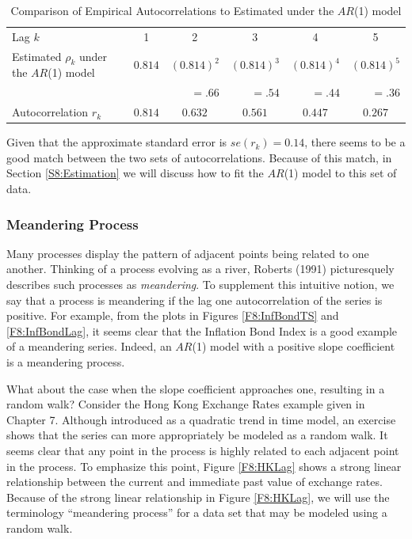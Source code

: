 \begin{table}[h]
\begin{center}
\caption{\label{T8:InfBondAutoEstimated} Comparison of Empirical
Autocorrelations to Estimated under the $AR$(1) model}
\begin{tabular}{l|ccccc}
\hline
Lag $k$ & 1 & 2 & 3 & 4 & 5 \\
Estimated $\rho_k$ under the $AR$(1) model & $0.814$ & $(0.814)^2$ & $%
(0.814)^{3}$ & $(0.814)^{4}$ & $(0.814)^{5}$ \\
&  & \multicolumn{1}{r}{$=.66$} &
\multicolumn{1}{r}{$=.54$} & \multicolumn{1}{r}{$=.44$} & \multicolumn{1}{r}{%
$=.36$} \\
Autocorrelation $r_k$ & $0.814$ & $0.632$ & $0.561$ & $0.447$ & $0.267$ \\
\hline
\end{tabular}\end{center}\end{table}


\bigskip

Given that the approximate standard error is $se(r_k) = 0.14$, there
seems to be a good match between the two sets of autocorrelations.
Because of this match, in Section \ref{S8:Estimation} we will
discuss how to fit the $AR$(1) model to this set of data.

\linejed

\subsubsection*{Meandering Process}

Many processes display the pattern of adjacent points being related
to one another. Thinking of a process evolving as a river, Roberts
(1991) picturesquely describes such processes as \emph{meandering}.
To supplement this intuitive notion, we say that a process is
meandering if the lag one autocorrelation of the series is positive.
For example, from the plots in Figures \ref{F8:InfBondTS} and
\ref{F8:InfBondLag}, it seems clear that the Inflation Bond Index is
a good example of a meandering series. Indeed, an $AR$(1) model with
a positive slope coefficient is a meandering process.

What about the case when the slope coefficient approaches one,
resulting in a random walk? Consider the Hong Kong Exchange Rates
example given in Chapter 7. Although introduced as a quadratic trend
in time model, an exercise shows that the series can more
appropriately be modeled as a random walk. It seems clear that any
point in the process is highly related to each adjacent point in the
process. To emphasize this point, Figure \ref{F8:HKLag} shows a
strong linear relationship between the current and immediate past
value of exchange rates. Because of the strong linear relationship
in Figure \ref{F8:HKLag}, we will use the terminology ``meandering
process'' for a data set that may be modeled using a random walk.

